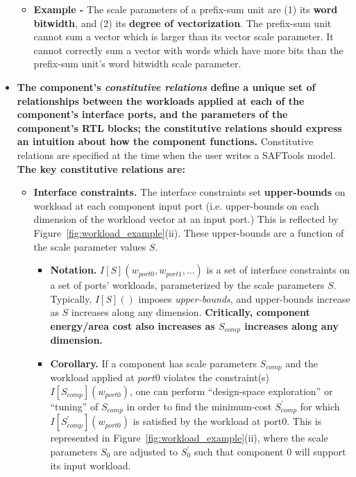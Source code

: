 \begin{itemize}
\begin{itemize}
        \item \textbf{Example -} The scale parameters of a prefix-sum unit are (1) its \textbf{word bitwidth}, and (2) its \textbf{degree of vectorization}. The prefix-sum unit cannot sum a vector which is larger than its vector scale parameter. It cannot correctly sum a vector with words which have more bits than the prefix-sum unit's word bitwidth scale parameter.
    \end{itemize}
    \item \textbf{The component's \textit{constitutive relations} define a unique set of relationships between the workloads applied at each of the component's interface ports, and the parameters of the component's RTL blocks; the constitutive relations should express an intuition about how the component functions.} Constitutive relations are specified at the time when the user writes a SAFTools model. \textbf{The key constitutive relations are:}
    \begin{itemize}
        \item \textbf{Interface constraints.} The interface constraints set \textbf{upper-bounds} on workload at each component input port (i.e. upper-bounds on each dimension of the workload vector at an input port.) This is reflected by Figure~\ref{fig:workload_example}(ii). These upper-bounds are a function of the scale parameter values $S$.
        \begin{itemize}
            \item \textbf{Notation.} $I[S](w_{port0},w_{port1},...)$ is a set of interface constraints on a set of ports' workloads, parameterized by the scale parameters $S$. Typically, $I[S]()$ imposes \textit{upper-bounds}, and upper-bounds increase as $S$ increases along any dimension. \textbf{Critically, component energy/area cost also increases as $S_{comp}$ increases along any dimension.}
            \item \textbf{Corollary.} If a component has scale parameters $S_{comp}$ and the workload applied at $port0$ violates the constraint(s) $I[S_{comp}](w_{port0})$, one can perform ``design-space exploration'' or ``tuning'' of $S_{comp}$ in order to find the minimum-cost $S^\prime_{comp}$ for which $I[S^\prime_{comp}](w_{port0})$ is satisfied by the workload at port0. This is represented in Figure~\ref{fig:workload_example}(ii), where the scale parameters $S_0$ are adjusted to $S^\prime_0$ such that component 0 will support its input workload.
        \end{itemize}

\end{itemize}
\end{itemize}

